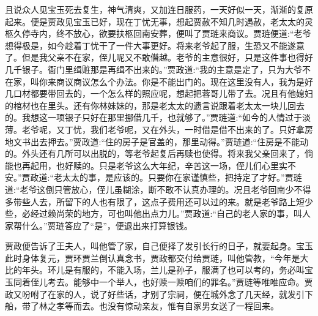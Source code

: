 \begin{parag}
    且说众人见宝玉死去复生，神气清爽，又加连日服药，一天好似一天，渐渐的复原起来。便是贾政见宝玉已好，现在丁忧无事，想起贾赦不知几时遇赦，老太太的灵柩久停寺内，终不放心，欲要扶柩回南安葬，便叫了贾琏来商议。贾琏便道:“老爷想得极是，如今趁着丁忧干了一件大事更好。将来老爷起了服，生恐又不能遂意了。但是我父亲不在家，侄儿呢又不敢僭越。老爷的主意很好，只是这件事也得好几千银子。衙门里缉赃那是再缉不出来的。”贾政道:“我的主意是定了，只为大爷不在家，叫你来商议商议怎么个办法。你是不能出门的。现在这里没有人，我为是好几口材都要带回去的，一个怎么样的照应呢，想起把蓉哥儿带了去。况且有他媳妇的棺材也在里头。还有你林妹妹的，那是老太太的遗言说跟着老太太一块儿回去的。我想这一项银子只好在那里挪借几千，也就够了。”贾琏道:“如今的人情过于淡薄。老爷呢，又丁忧，我们老爷呢，又在外头，一时借是借不出来的了。只好拿房地文书出去押去。”贾政道:“住的房子是官盖的，那里动得。”贾琏道:“住房是不能动的。外头还有几所可以出脱的，等老爷起复后再赎也使得。将来我父亲回来了，倘能也再起用，也好赎的。只是老爷这么大年纪，辛苦这一场，侄儿们心里实不安。”贾政道:“老太太的事，是应该的。只要你在家谨慎些，把持定了才好。”贾琏道:“老爷这倒只管放心，侄儿虽糊涂，断不敢不认真办理的。况且老爷回南少不得多带些人去，所留下的人也有限了，这点子费用还可以过的来。就是老爷路上短少些，必经过赖尚荣的地方，可也叫他出点力儿。”贾政道:“自己的老人家的事，叫人家帮什么。”贾琏答应了“是”，便退出来打算银钱。
\end{parag}


\begin{parag}
    贾政便告诉了王夫人，叫他管了家，自己便择了发引长行的日子，就要起身。宝玉此时身体复元，贾环贾兰倒认真念书，贾政都交付给贾琏，叫他管教，“今年是大比的年头。环儿是有服的，不能入场，兰儿是孙子，服满了也可以考的，务必叫宝玉同着侄儿考去。能够中一个举人，也好赎一赎咱们的罪名。”贾琏等唯唯应命。贾政又吩咐了在家的人，说了好些话，才别了宗祠，便在城外念了几天经，就发引下船，带了林之孝等而去。也没有惊动亲友，惟有自家男女送了一程回来。
\end{parag}


